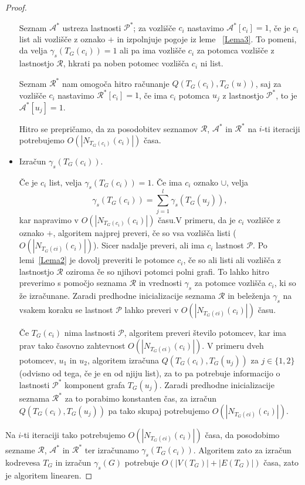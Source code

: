\documentclass[12pt,a4paper,twoside]{article}
\theoremstyle{definition} %
\theoremstyle{plain} %
\numberwithin{equation}{section}  %
\begin{document}
\begin{proof}
\begin{itemize}
Seznam $\mathcal{A^*}$ ustreza lastnosti $\mathcal{P^*}$; za vozlišče $c_i$ nastavimo $\mathcal{A}^*[{c_i}]=1$, če je $c_i$ list ali vozlišče z oznako $+$ in izpolnjuje pogoje iz leme ~\ref{Lema3}. To pomeni, da velja  $\gamma_s(T_G(c_i)) = 1$ ali pa ima vozlišče $c_i$ za potomca vozlišče z lastnostjo $\mathcal{R}$, hkrati pa noben potomec vozlišča $c_i$ ni list.

Seznam $\mathcal{R^*}$ nam omogoča hitro računanje $Q(T_G(c_i), T_G(u))$, saj za vozlišče $c_i$ nastavimo $\mathcal{R^*}[c_i] = 1$, če ima $c_i$ potomca $u_j$ z lastnostjo $\mathcal{P^*}$, to je $\mathcal{A^*}[u_j] = 1$.

Hitro se prepričamo, da za posodobitev seznamov $\mathcal{R}$, $\mathcal{A^*}$ in $\mathcal{R^*}$ na $i$-ti iteraciji potrebujemo $O(|N_{T_G(c_i)}(c_i)|)$ časa.

\item Izračun $\gamma_s(T_G(c_i))$.

Če je $c_i$ list, velja $\gamma_s(T_G(c_i)) = 1$. Če ima $c_i$ oznako $\cup$, velja $$\gamma_s(T_G(c_i)) = \sum\limits_{j=1}^l \gamma_s(T_G(u_j)),$$ kar napravimo v $O(|N_{T_G(c_i)}(c_i)|)$ času.V primeru, da je $c_i$ vozlišče z oznako $+$, algoritem najprej preveri, če so vsa vozlišča listi ($O(|N_{T_G(ci)}(c_i)|)$). Sicer nadalje preveri, ali ima $c_i$ lastnost $\mathcal{P}$. Po lemi~\ref{Lema2} je dovolj preveriti le potomce $c_i$, če so ali listi ali vozlišča z lastnostjo $\mathcal{R}$ oziroma če so njihovi potomci polni grafi. To lahko hitro preverimo s pomočjo seznama $\mathcal{R}$ in vrednosti $\gamma_s$ za potomce vozlišča $c_i$, ki so že izračunane. Zaradi predhodne inicializacije seznama $\mathcal{R}$ in beleženja $\gamma_s$ na vsakem koraku se lastnost $\mathcal{P}$ lahko preveri v $O(|N_{T_G(ci)}(c_i)|)$ času.

Če $T_G(c_i)$ nima lastnosti $\mathcal{P}$, algoritem preveri število potomcev, kar ima prav tako časovno zahtevnost $O(|N_{T_G(ci)}(c_i)|)$. V primeru dveh potomcev, $u_1$ in $u_2$, algoritem izračuna $Q(T_G(c_i), T_G(u_j))$ za $j \in \{1, 2\}$ (odvisno od tega, če je en od njiju list), za to pa potrebuje informacijo o lastnosti $\mathcal{P^*}$ komponent grafa $T_G(u_j)$. Zaradi predhodne inicializacije seznama $\mathcal{R^*}$ za to porabimo konstanten čas, za izračun $Q(T_G(c_i), T_G(u_j))$ pa tako skupaj potrebujemo  $O(|N_{T_G(ci)}(c_i)|)$. 
\end{itemize}
Na $i$-ti iteraciji tako potrebujemo $O(|N_{T_G(ci)}(c_i)|)$ časa, da posodobimo sezname $\mathcal{R}$, $\mathcal{A^*}$ in $\mathcal{R^*}$ ter izračunamo $\gamma_s(T_G(c_i))$. Algoritem zato za izračun kodrevesa $T_G$ in izračun $\gamma_s(G)$  potrebuje $O(|V(T_G)| + |E(T_G)|)$ časa, zato je algoritem linearen.
\end{proof}
\end{document}

